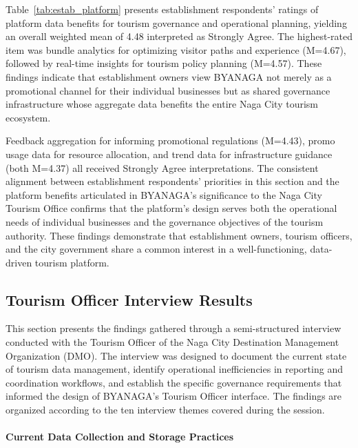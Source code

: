\documentclass{research}
\begin{document}
Table~\ref{tab:estab_platform} presents establishment respondents' ratings of 
platform data benefits for tourism governance and operational planning, yielding 
an overall weighted mean of 4.48 interpreted as Strongly Agree. The highest-rated 
item was bundle analytics for optimizing visitor paths and experience (M=4.67), 
followed by real-time insights for tourism policy planning (M=4.57). These 
findings indicate that establishment owners view BYANAGA not merely as a 
promotional channel for their individual businesses but as shared governance 
infrastructure whose aggregate data benefits the entire Naga City tourism 
ecosystem.

Feedback aggregation for informing promotional regulations (M=4.43), promo 
usage data for resource allocation, and trend data for infrastructure guidance 
(both M=4.37) all received Strongly Agree interpretations. The consistent 
alignment between establishment respondents' priorities in this section and the 
platform benefits articulated in BYANAGA's significance to the Naga City Tourism 
Office confirms that the platform's design serves both the operational needs of 
individual businesses and the governance objectives of the tourism authority. 
These findings demonstrate that establishment owners, tourism officers, and the 
city government share a common interest in a well-functioning, data-driven 
tourism platform.

\subsection{Tourism Officer Interview Results}

This section presents the findings gathered through a semi-structured interview
conducted with the Tourism Officer of the Naga City Destination Management
Organization (DMO). The interview was designed to document the current state of
tourism data management, identify operational inefficiencies in reporting and
coordination workflows, and establish the specific governance requirements that
informed the design of BYANAGA's Tourism Officer interface. The findings are
organized according to the ten interview themes covered during the session.


\paragraph{Current Data Collection and Storage Practices}
\end{document}
